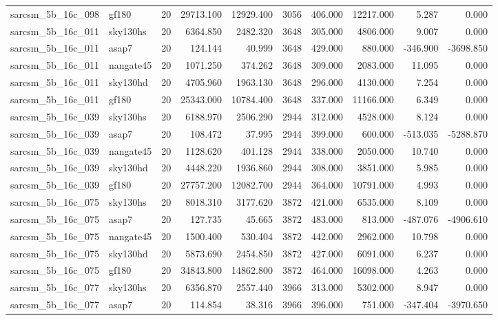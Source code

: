 \begin{longtable}{llrrrrrrrr}
sarcsm\_5b\_16c\_098 & gf180 & 20 & 29713.100 & 12929.400 & 3056 & 406.000 & 12217.000 & 5.287 & 0.000 \\
sarcsm\_5b\_16c\_011 & sky130hs & 20 & 6364.850 & 2482.320 & 3648 & 305.000 & 4806.000 & 9.007 & 0.000 \\
sarcsm\_5b\_16c\_011 & asap7 & 20 & 124.144 & 40.999 & 3648 & 429.000 & 880.000 & -346.900 & -3698.850 \\
sarcsm\_5b\_16c\_011 & nangate45 & 20 & 1071.250 & 374.262 & 3648 & 309.000 & 2083.000 & 11.095 & 0.000 \\
sarcsm\_5b\_16c\_011 & sky130hd & 20 & 4705.960 & 1963.130 & 3648 & 296.000 & 4130.000 & 7.254 & 0.000 \\
sarcsm\_5b\_16c\_011 & gf180 & 20 & 25343.000 & 10784.400 & 3648 & 337.000 & 11166.000 & 6.349 & 0.000 \\
sarcsm\_5b\_16c\_039 & sky130hs & 20 & 6188.970 & 2506.290 & 2944 & 312.000 & 4528.000 & 8.124 & 0.000 \\
sarcsm\_5b\_16c\_039 & asap7 & 20 & 108.472 & 37.995 & 2944 & 399.000 & 600.000 & -513.035 & -5288.870 \\
sarcsm\_5b\_16c\_039 & nangate45 & 20 & 1128.620 & 401.128 & 2944 & 338.000 & 2050.000 & 10.740 & 0.000 \\
sarcsm\_5b\_16c\_039 & sky130hd & 20 & 4448.220 & 1936.860 & 2944 & 308.000 & 3851.000 & 5.985 & 0.000 \\
sarcsm\_5b\_16c\_039 & gf180 & 20 & 27757.200 & 12082.700 & 2944 & 364.000 & 10791.000 & 4.993 & 0.000 \\
sarcsm\_5b\_16c\_075 & sky130hs & 20 & 8018.310 & 3177.620 & 3872 & 421.000 & 6535.000 & 8.109 & 0.000 \\
sarcsm\_5b\_16c\_075 & asap7 & 20 & 127.735 & 45.665 & 3872 & 483.000 & 813.000 & -487.076 & -4906.610 \\
sarcsm\_5b\_16c\_075 & nangate45 & 20 & 1500.400 & 530.404 & 3872 & 442.000 & 2962.000 & 10.798 & 0.000 \\
sarcsm\_5b\_16c\_075 & sky130hd & 20 & 5873.690 & 2454.850 & 3872 & 427.000 & 6091.000 & 6.237 & 0.000 \\
sarcsm\_5b\_16c\_075 & gf180 & 20 & 34843.800 & 14862.800 & 3872 & 464.000 & 16098.000 & 4.263 & 0.000 \\
sarcsm\_5b\_16c\_077 & sky130hs & 20 & 6356.870 & 2557.440 & 3966 & 313.000 & 5302.000 & 8.947 & 0.000 \\
sarcsm\_5b\_16c\_077 & asap7 & 20 & 114.854 & 38.316 & 3966 & 396.000 & 751.000 & -347.404 & -3970.650 \\

\end{longtable}
